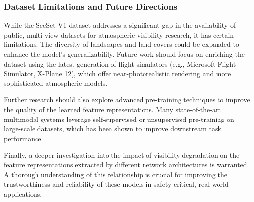 \subsubsection{Dataset Limitations and Future Directions}

While the SeeSet V1 dataset addresses a significant gap in the availability of public, multi-view datasets for atmospheric visibility research, it has certain limitations. The diversity of landscapes and land covers could be expanded to enhance the model's generalizability. Future work should focus on enriching the dataset using the latest generation of flight simulators (e.g., Microsoft Flight Simulator, X-Plane 12), which offer near-photorealistic rendering and more sophisticated atmospheric models.

Further research should also explore advanced pre-training techniques to improve the quality of the learned feature representations. Many state-of-the-art multimodal systems leverage self-supervised or unsupervised pre-training on large-scale datasets, which has been shown to improve downstream task performance.

Finally, a deeper investigation into the impact of visibility degradation on the feature representations extracted by different network architectures is warranted. A thorough understanding of this relationship is crucial for improving the trustworthiness and reliability of these models in safety-critical, real-world applications.




